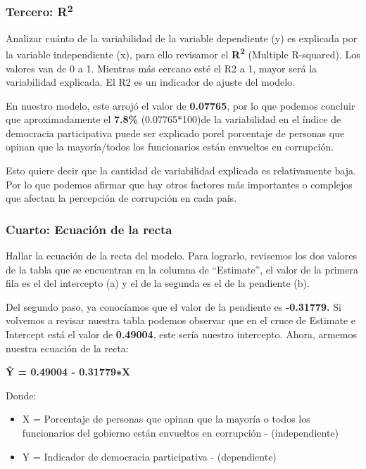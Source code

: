 \documentclass[
]{article}
\providecommand{\tightlist}{%
  \setlength{\itemsep}{0pt}\setlength{\parskip}{0pt}}
\begin{document}
\hypertarget{tercero-r2}{%
\subsubsection{\texorpdfstring{Tercero:
R\textsuperscript{2}}{Tercero: R2}}\label{tercero-r2}}

Analizar cuánto de la variabilidad de la variable dependiente (y) es
explicada por la variable independiente (x), para ello revisamor el
\textbf{R\textsuperscript{2}} (Multiple R-squared). Los valores van de 0
a 1. Mientras más cercano esté el R2 a 1, mayor será la variabilidad
explicada. El R2 es un indicador de ajuste del modelo.

En nuestro modelo, este arrojó el valor de \textbf{0.07765}, por lo que
podemos concluir que aproximadamente el \textbf{7.8\%} (0.07765*100)de
la variabilidad en el índice de democracia participativa puede ser
explicado porel porcentaje de personas que opinan que la mayoría/todos
los funcionarios están envueltos en corrupción.

Esto quiere decir que la cantidad de variabilidad explicada es
relativamente baja. Por lo que podemos afirmar que hay otros factores
más importantes o complejos que afectan la percepción de corrupción en
cada país.

\hypertarget{cuarto-ecuaciuxf3n-de-la-recta}{%
\subsubsection{Cuarto: Ecuación de la
recta}\label{cuarto-ecuaciuxf3n-de-la-recta}}

Hallar la ecuación de la recta del modelo. Para lograrlo, revisemos los
dos valores de la tabla que se encuentran en la columna de ``Estimate'',
el valor de la primera fila es el del intercepto (a) y el de la segunda
es el de la pendiente (b).

Del segundo paso, ya conocíamos que el valor de la pendiente es
\textbf{-0.31779.} Si volvemos a revisar nuestra tabla podemos observar
que en el cruce de Estimate e Intercept está el valor de
\textbf{0.49004}, este sería nuestro intercepto. Ahora, armemos nuestra
ecuación de la recta:

\textbf{Ŷ = 0.49004 - 0.31779∗X}

Donde:

\begin{itemize}
\tightlist
\item
  X = Porcentaje de personas que opinan que la mayoría o todos los
  funcionarios del gobierno están envueltos en corrupción -
  (independiente)
\item
  Y = Indicador de democracia participativa - (dependiente)
\end{itemize}
\end{document}
